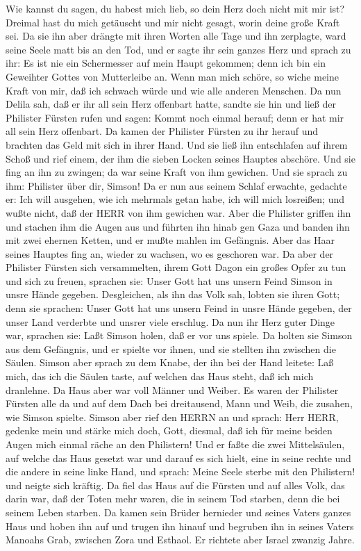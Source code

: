 Wie kannst du sagen, du habest mich lieb, so dein Herz doch nicht mit
mir ist? Dreimal hast du mich getäuscht und mir nicht gesagt, worin
deine große Kraft sei.  Da sie ihn aber drängte mit ihren
Worten alle Tage und ihn zerplagte, ward seine Seele matt bis an den
Tod,  und er sagte ihr sein ganzes Herz und sprach zu ihr:
Es ist nie ein Schermesser auf mein Haupt gekommen; denn ich bin ein
Geweihter Gottes von Mutterleibe an. Wenn man mich schöre, so wiche
meine Kraft von mir, daß ich schwach würde und wie alle anderen
Menschen.  Da nun Delila sah, daß er ihr all sein Herz
offenbart hatte, sandte sie hin und ließ der Philister Fürsten rufen und
sagen: Kommt noch einmal herauf; denn er hat mir all sein Herz
offenbart. Da kamen der Philister Fürsten zu ihr herauf und brachten das
Geld mit sich in ihrer Hand.  Und sie ließ ihn entschlafen
auf ihrem Schoß und rief einem, der ihm die sieben Locken seines Hauptes
abschöre. Und sie fing an ihn zu zwingen; da war seine Kraft von ihm
gewichen.  Und sie sprach zu ihm: Philister über dir,
Simson! Da er nun aus seinem Schlaf erwachte, gedachte er: Ich will
ausgehen, wie ich mehrmals getan habe, ich will mich losreißen; und
wußte nicht, daß der HERR von ihm gewichen war.  Aber die
Philister griffen ihn und stachen ihm die Augen aus und führten ihn
hinab gen Gaza und banden ihn mit zwei ehernen Ketten, und er mußte
mahlen im Gefängnis.  Aber das Haar seines Hauptes fing an,
wieder zu wachsen, wo es geschoren war.  Da aber der
Philister Fürsten sich versammelten, ihrem Gott Dagon ein großes Opfer
zu tun und sich zu freuen, sprachen sie: Unser Gott hat uns unsern Feind
Simson in unsre Hände gegeben.  Desgleichen, als ihn das
Volk sah, lobten sie ihren Gott; denn sie sprachen: Unser Gott hat uns
unsern Feind in unsre Hände gegeben, der unser Land verderbte und unsrer
viele erschlug.  Da nun ihr Herz guter Dinge war, sprachen
sie: Laßt Simson holen, daß er vor uns spiele. Da holten sie Simson aus
dem Gefängnis, und er spielte vor ihnen, und sie stellten ihn zwischen
die Säulen.  Simson aber sprach zu dem Knabe, der ihn bei
der Hand leitete: Laß mich, das ich die Säulen taste, auf welchen das
Haus steht, daß ich mich dranlehne.  Da Haus aber war voll
Männer und Weiber. Es waren der Philister Fürsten alle da und auf dem
Dach bei dreitausend, Mann und Weib, die zusahen, wie Simson spielte.
 Simson aber rief den HERRN an und sprach: Herr HERR,
gedenke mein und stärke mich doch, Gott, diesmal, daß ich für meine
beiden Augen mich einmal räche an den Philistern!  Und er
faßte die zwei Mittelsäulen, auf welche das Haus gesetzt war und darauf
es sich hielt, eine in seine rechte und die andere in seine linke Hand,
 und sprach: Meine Seele sterbe mit den Philistern! und
neigte sich kräftig. Da fiel das Haus auf die Fürsten und auf alles
Volk, das darin war, daß der Toten mehr waren, die in seinem Tod
starben, denn die bei seinem Leben starben.  Da kamen sein
Brüder hernieder und seines Vaters ganzes Haus und hoben ihn auf und
trugen ihn hinauf und begruben ihn in seines Vaters Manoahs Grab,
zwischen Zora und Esthaol. Er richtete aber Israel zwanzig Jahre.

